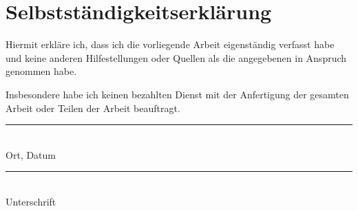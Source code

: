 \cleardoublepage %
\section*{Selbstständigkeitserklärung}
Hiermit erkläre ich, dass ich die vorliegende Arbeit eigenständig verfasst habe und keine anderen Hilfestellungen oder Quellen als die angegebenen in Anspruch genommen habe.

Insbesondere habe ich keinen bezahlten Dienst mit der Anfertigung der gesamten Arbeit oder Teilen der Arbeit beauftragt.

\vspace*{2cm}
\begin{center}
   \begin{minipage}{0.3\textwidth}
      \centering
      \rule{4cm}{0.2mm}\\
      Ort, Datum
   \end{minipage}\hfill
   \begin{minipage}{0.6\textwidth}
      \centering
      \rule{8cm}{0.2mm}\\
      Unterschrift
   \end{minipage}
\end{center}
\vfill
